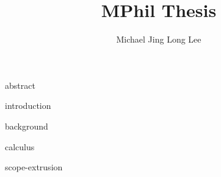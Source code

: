 \documentclass[12pt,a4paper,twoside,openany,BCOR=2cm]{scrbook}
\title{MPhil Thesis}
\author{Michael Jing Long Lee}
\begin{document}
\frontmatter
{
\maketitle

\hypersetup{linkcolor=black, linkbordercolor=white}
\tableofcontents

{abstract}
 }
\mainmatter
{introduction}

{background}

{calculus}

{scope-extrusion}


\end{document}
